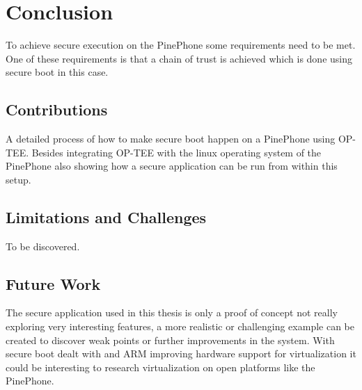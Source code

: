 \documentclass{report}
\begin{document}
\chapter{Conclusion}

To achieve secure execution on the PinePhone some requirements need to be met. One of these requirements is that a chain of trust is achieved which is done using secure boot in this case.

\section{Contributions}

A detailed process of how to make secure boot happen on a PinePhone using OP-TEE. Besides integrating OP-TEE with the linux operating system of the PinePhone also showing how a secure application can be run from within this setup.

\section{Limitations and Challenges}

To be discovered.

\section{Future Work}

The secure application used in this thesis is only a proof of concept not really exploring very interesting features, a more realistic or challenging example can be created to discover weak points or further improvements in the system. With secure boot dealt with and ARM improving hardware support for virtualization it could be interesting to research virtualization on open platforms like the PinePhone.
\end{document}
